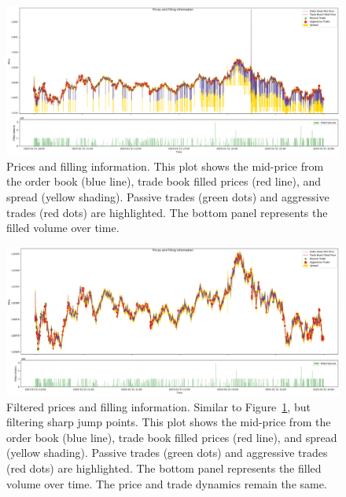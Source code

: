 \begin{figure}
    \centering
    \includegraphics[width=\linewidth]{figures/Prices and Filling Information.png}
    \caption{Prices and filling information. This plot shows the mid-price from the order book (blue line), trade book filled prices (red line), and spread (yellow shading). Passive trades (green dots) and aggressive trades (red dots) are highlighted. The bottom panel represents the filled volume over time.}
    \label{fig:p_f_i}
\end{figure}

\begin{figure}
    \centering
    \includegraphics[width=\linewidth]{figures/Filtered Prices and Filling Information.png}
    \caption{Filtered prices and filling information. Similar to Figure~\ref{fig:p_f_i}, but filtering sharp jump points. This plot shows the mid-price from the order book (blue line), trade book filled prices (red line), and spread (yellow shading). Passive trades (green dots) and aggressive trades (red dots) are highlighted. The bottom panel represents the filled volume over time. The price and trade dynamics remain the same.}
    \label{fig:f_p_f_i}
\end{figure}



